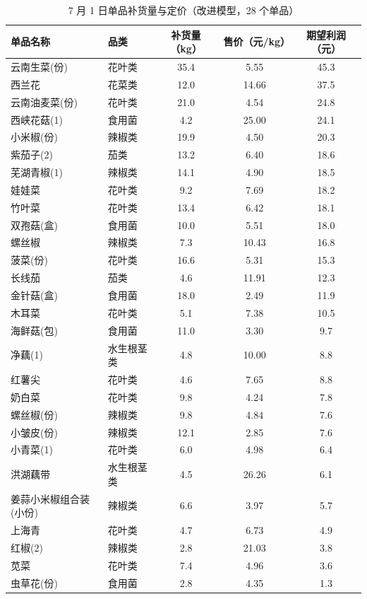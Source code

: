 \documentclass[12pt]{ctexart}
\begin{document}
\begin{table}[htbp]
\centering
\caption{7 月 1 日单品补货量与定价（改进模型，28 个单品）}
\label{tab:itemlist}
\small
\begin{tabular}{llccc}
\toprule
单品名称 & 品类 & 补货量（kg） & 售价（元/kg） & 期望利润（元） \\
\midrule
云南生菜(份) & 花叶类 & 35.4 & 5.55 & 45.3 \\
西兰花 & 花菜类 & 12.0 & 14.66 & 37.5 \\
云南油麦菜(份) & 花叶类 & 21.0 & 4.54 & 24.8 \\
西峡花菇(1) & 食用菌 & 4.2 & 25.00 & 24.1 \\
小米椒(份) & 辣椒类 & 19.9 & 4.50 & 20.3 \\
紫茄子(2) & 茄类 & 13.2 & 6.40 & 18.6 \\
芜湖青椒(1) & 辣椒类 & 14.1 & 4.90 & 18.5 \\
娃娃菜 & 花叶类 & 9.2 & 7.69 & 18.2 \\
竹叶菜 & 花叶类 & 13.4 & 6.42 & 18.1 \\
双孢菇(盒) & 食用菌 & 10.0 & 5.51 & 18.0 \\
螺丝椒 & 辣椒类 & 7.3 & 10.43 & 16.8 \\
菠菜(份) & 花叶类 & 16.6 & 5.31 & 15.3 \\
长线茄 & 茄类 & 4.6 & 11.91 & 12.3 \\
金针菇(盒) & 食用菌 & 18.0 & 2.49 & 11.9 \\
木耳菜 & 花叶类 & 5.1 & 7.38 & 10.5 \\
海鲜菇(包) & 食用菌 & 11.0 & 3.30 & 9.7 \\
净藕(1) & 水生根茎类 & 4.8 & 10.00 & 8.8 \\
红薯尖 & 花叶类 & 4.6 & 7.65 & 8.8 \\
奶白菜 & 花叶类 & 9.8 & 4.24 & 7.8 \\
螺丝椒(份) & 辣椒类 & 9.8 & 4.84 & 7.6 \\
小皱皮(份) & 辣椒类 & 12.1 & 2.85 & 7.6 \\
小青菜(1) & 花叶类 & 6.0 & 4.98 & 6.4 \\
洪湖藕带 & 水生根茎类 & 4.5 & 26.26 & 6.1 \\
姜蒜小米椒组合装(小份) & 辣椒类 & 6.6 & 3.97 & 5.7 \\
上海青 & 花叶类 & 4.7 & 6.73 & 4.9 \\
红椒(2) & 辣椒类 & 2.8 & 21.03 & 3.8 \\
苋菜 & 花叶类 & 7.4 & 4.96 & 3.6 \\
虫草花(份) & 食用菌 & 2.8 & 4.35 & 1.3 \\
\bottomrule
\end{tabular}
\end{table}
\end{document}
